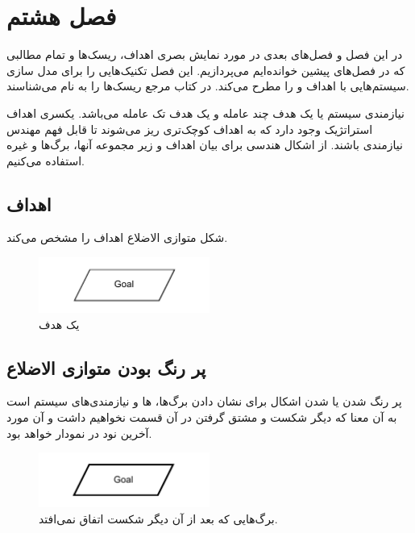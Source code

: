 \newpage

\section{فصل هشتم}

در این فصل و فصل‌های بعدی در مورد نمایش بصری اهداف، ریسک‌ها و تمام مطالبی که در
فصل‌های پیشین خوانده‌ایم می‌پردازیم. این فصل تکنیک‌هایی را برای مدل سازی
سیستم‌هایی با اهداف  و  را مطرح می‌کند. در کتاب مرجع ریسک‌ها را
به نام  می‌شناسند.

نیازمندی سیستم یا  یک هدف چند عامله و  یک هدف تک عامله می‌باشد. یکسری اهداف استراتژیک وجود دارد که به
اهداف کوچک‌تری ریز می‌شوند تا قابل فهم مهندس نیازمندی باشند. از اشکال هندسی برای
بیان اهداف و زیر مجموعه آنها، برگ‌ها و غیره استفاده می‌کنیم.

\subsection{اهداف}

شکل متوازی الاضلاع اهداف را مشخص می‌کند.

\begin{figure}[H]
    \centering
    \includegraphics[width=0.5\textwidth]{assets/goal.drawio.pdf}
    \caption{یک هدف}
\end{figure}

\subsection{پر رنگ بودن متوازی الاضلاع}

پر رنگ شدن یا  شدن اشکال برای نشان دادن برگ‌ها، ها و
نیازمندی‌های سیستم است به آن معنا که دیگر شکست و مشتق گرفتن در آن قسمت نخواهیم
داشت و آن مورد آخرین نود در نمودار خواهد بود.

\begin{figure}[H]
    \centering
    \includegraphics[width=0.5\textwidth]{assets/complete_goal.drawio.pdf}
    \caption{برگ‌هایی که بعد از آن دیگر شکست اتفاق نمی‌افتد.}
\end{figure}


